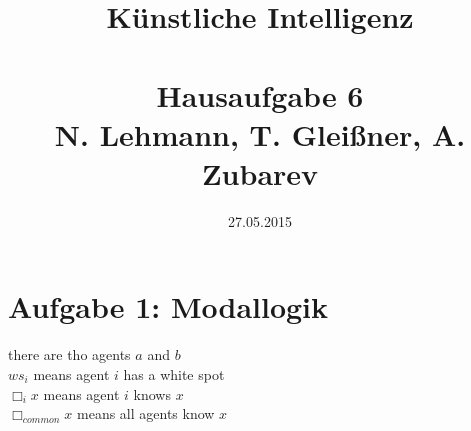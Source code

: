 \documentclass{article}
\title{Künstliche Intelligenz\\~\\Hausaufgabe 6\\ \small{N. Lehmann, T. Gleißner, A. Zubarev}}
\date{27.05.2015}
\newcommand{\lbox}{\Box}
\begin{document}
\maketitle

\section*{Aufgabe 1: Modallogik}

there are tho agents $a$ and $b$ \\
$ws_i$ means agent $i$ has a white spot \\
$\lbox_i x$ means agent $i$ knows $x$ \\
$\lbox_{common} x$ means all agents know $x$ \\
\end{document}
